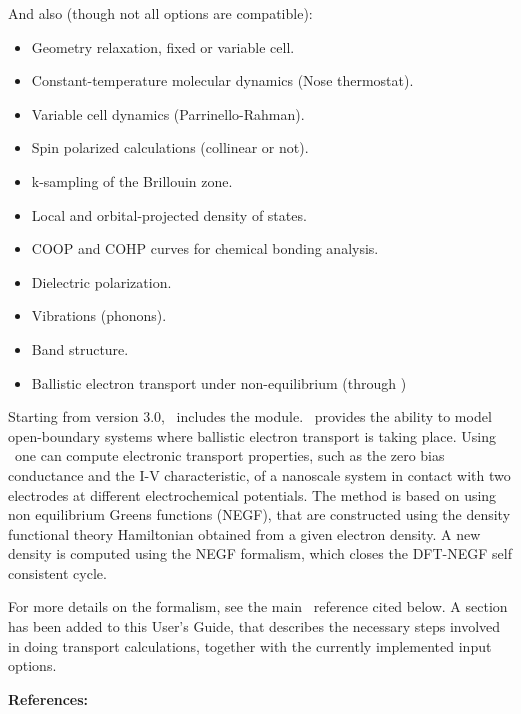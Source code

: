And also (though not all options are compatible):
\begin{itemize}
\item Geometry relaxation, fixed or variable cell.
\item Constant-temperature molecular dynamics (Nose thermostat).
\item Variable cell dynamics (Parrinello-Rahman).
\item Spin polarized calculations (collinear or not).
\item k-sampling of the Brillouin zone.
\item Local and orbital-projected density of states.
\item COOP and COHP curves for chemical bonding analysis.
\item Dielectric polarization.
\item Vibrations (phonons).
\item Band structure.
\item Ballistic electron transport under non-equilibrium (through \tsiesta)
\end{itemize}


Starting from version 3.0, \siesta\ includes the \tsiesta{}
module. \tsiesta\ provides the ability to model open-boundary systems where ballistic
electron transport is taking place.  Using \tsiesta\ one can compute electronic
transport properties, such as the zero bias conductance and the I-V characteristic, of a
nanoscale system in contact with two electrodes at different electrochemical potentials.
The method is based on using non equilibrium Greens functions (NEGF), that are
constructed using the density functional theory Hamiltonian obtained from a given electron
density. A new density is computed using the NEGF formalism, which closes the DFT-NEGF
self consistent cycle.

For more details on the formalism, see the main \tsiesta\
reference cited below. A section has been added to this User's Guide,
that describes the necessary steps involved in doing transport
calculations, together with the currently implemented input options.

\vspace{0.5cm}
{\large \textbf{References:} }

